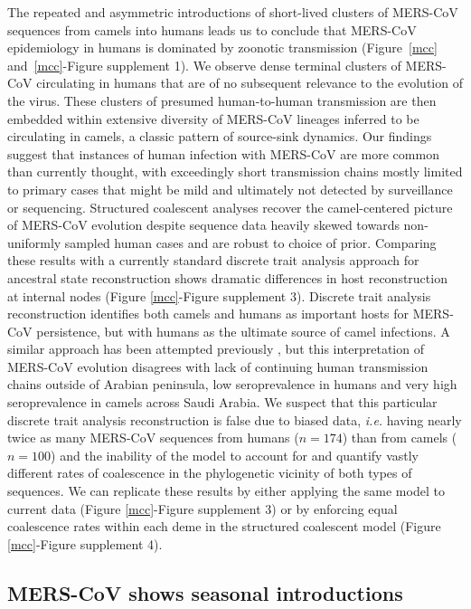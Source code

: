 \documentclass[9pt,lineno]{elife}
\begin{document}
The repeated and asymmetric introductions of short-lived clusters of MERS-CoV sequences from camels into humans leads us to conclude that MERS-CoV epidemiology in humans is dominated by zoonotic transmission (Figure~\ref{mcc} and~\ref{mcc}-Figure supplement 1).
We observe dense terminal clusters of MERS-CoV circulating in humans that are of no subsequent relevance to the evolution of the virus.
These clusters of presumed human-to-human transmission are then embedded within extensive diversity of MERS-CoV lineages inferred to be circulating in camels, a classic pattern of source-sink dynamics.
Our findings suggest that instances of human infection with MERS-CoV are more common than currently thought, with exceedingly short transmission chains mostly limited to primary cases that might be mild and ultimately not detected by surveillance or sequencing.
Structured coalescent analyses recover the camel-centered picture of MERS-CoV evolution despite sequence data heavily skewed towards non-uniformly sampled human cases and are robust to choice of prior.
Comparing these results with a currently standard discrete trait analysis \citep{lemey_bayesian_2009} approach for ancestral state reconstruction shows dramatic differences in host reconstruction at internal nodes (Figure \ref{mcc}-Figure supplement 3).
Discrete trait analysis reconstruction identifies both camels and humans as important hosts for MERS-CoV persistence, but with humans as the ultimate source of camel infections.
A similar approach has been attempted previously \citep{zhang_evolutionary_2016}, but this interpretation of MERS-CoV evolution disagrees with lack of continuing human transmission chains outside of Arabian peninsula, low seroprevalence in humans and very high seroprevalence in camels across Saudi Arabia.
We suspect that this particular discrete trait analysis reconstruction is false due to biased data, \textit{i.e.} having nearly twice as many MERS-CoV sequences from humans ($n=174$) than from camels ($n=100$) and the inability of the model to account for and quantify vastly different rates of coalescence in the phylogenetic vicinity of both types of sequences.
We can replicate these results by either applying the same model to current data (Figure \ref{mcc}-Figure supplement 3) or by enforcing equal coalescence rates within each deme in the structured coalescent model (Figure \ref{mcc}-Figure supplement 4).


\subsection*{MERS-CoV shows seasonal introductions}
\end{document}
